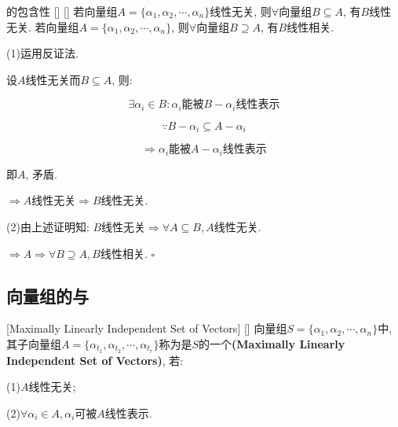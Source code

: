 \documentclass[UTF8]{ctexart}
\begin{document}
		\begin{ppt}
			[]
			{ 的包含性}
			[]
			[]
			若向量组$A=\{\alpha_{1}, \alpha_{2}, \cdots, \alpha_{n}\}$线性无关, 则$\forall$向量组$B\subseteq A$, 有$B$线性无关. 
			若向量组$A=\{\alpha_{1}, \alpha_{2}, \cdots, \alpha_{n}\}$, 则$\forall$向量组$B\supseteq A$, 有$B$线性相关. 
						
		\end{ppt}
		\begin{prf}
		
			(1)运用反证法. 
			
			设$A$线性无关而$B\subseteq A$, 则: 
			
			$$\exists \alpha_{i}\in B: \alpha_{i}\mbox{能被}B-\alpha_{i}\mbox{线性表示}$$
			
			$$\because B-\alpha_{i}\subseteq A-\alpha_{i}$$
			
			$$\Longrightarrow \alpha_{i}\mbox{能被}A-\alpha_{i}\mbox{线性表示}$$
			
			即$A$, 矛盾. 
			
			$\Longrightarrow A$线性无关$\Longrightarrow B$线性无关. 
			
			(2)由上述证明知: $B$线性无关$\Longrightarrow \forall A \subseteq B, A$线性无关. 
			
			$\Longrightarrow A$$\Longrightarrow \forall B \supseteq A, B$线性相关. $\square$
		\end{prf}
	\subsection{向量组的 与\秩}
		
		\begin{dfn}
			{}
			[Maximally Linearly Independent Set of Vectors]
			[]
			向量组$S=\{\alpha_{1}, \alpha_{2}, \cdots, \alpha_{n}\}$中, 其子向量组$A=\{\alpha_{t_{1}}, \alpha_{t_{2}}, \cdots, \alpha_{t_{r}}\}$称为是$S$的一个\textbf{(Maximally Linearly Independent Set of Vectors)}, 若: 
			
			(1)$A$线性无关; 
			
			(2)$\forall \alpha_{i}\in A, \alpha_{i}$可被$A$线性表示. 
		
		\end{dfn}
			
\end{document}
